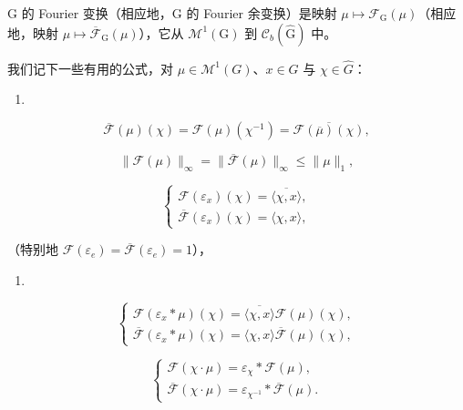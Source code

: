 G 的 Fourier 变换（相应地，G 的 Fourier 余变换）是映射 \(\mu \mapsto \mathcal{F}_{\mathrm{G}}(\mu)\)（相应地，映射 \(\mu \mapsto \overline{\mathcal{F}}_{\mathrm{G}}(\mu)\)），它从 \(\mathcal{M}^1 (\mathrm{G})\) 到 \(\mathcal{C}_b(\widehat{\mathrm{G}})\) 中。

我们记下一些有用的公式，对 \(\mu\in\mathcal{M}^{1}(G)\)、\(x\in G\) 与 \(\chi\in\widehat{G}\)：

\begin{enumerate}
\def\labelenumi{(\arabic{enumi})}
\setcounter{enumi}{7}
\tightlist
\item
\end{enumerate}

\[
\overline {{\mathcal {F}}} (\mu) (\chi) = \mathcal {F} (\mu) (\chi^ {- 1}) = \overline {{\mathcal {F} (\overline {{\mu}}) (\chi)}},\tag{9}
\]

\[
\| \mathcal {F} (\mu) \| _ {\infty} = \| \overline {{\mathcal {F}}} (\mu) \| _ {\infty} \leqslant \| \mu \| _ {1},\tag{10}
\]

\[
\left\{ \begin{array}{l} \mathcal {F} (\varepsilon_ {x}) (\chi) = \overline {{\langle \chi , x \rangle}}, \\ \overline {{\mathcal {F}}} (\varepsilon_ {x}) (\chi) = \langle \chi , x \rangle , \end{array} \right.
\]

（特别地 \(\mathcal{F}(\varepsilon_e) = \overline{\mathcal{F}} (\varepsilon_e) = 1\)），

\begin{enumerate}
\def\labelenumi{(\arabic{enumi})}
\setcounter{enumi}{10}
\tightlist
\item
\end{enumerate}

\[
\left\{ \begin{array}{l} \mathcal {F} (\varepsilon_ {x} * \mu) (\chi) = \overline {{\langle \chi , x \rangle}} \mathcal {F} (\mu) (\chi), \\ \overline {{\mathcal {F}}} (\varepsilon_ {x} * \mu) (\chi) = \langle \chi , x \rangle \overline {{\mathcal {F}}} (\mu) (\chi), \end{array} \right.\tag{12}
\]

\[
\left\{ \begin{array}{l} \mathcal {F} (\chi \cdot \mu) = \varepsilon_ {\chi} * \mathcal {F} (\mu), \\ \overline {{\mathcal {F}}} (\chi \cdot \mu) = \varepsilon_ {\chi^ {- 1}} * \overline {{\mathcal {F}}} (\mu). \end{array} \right.
\]

